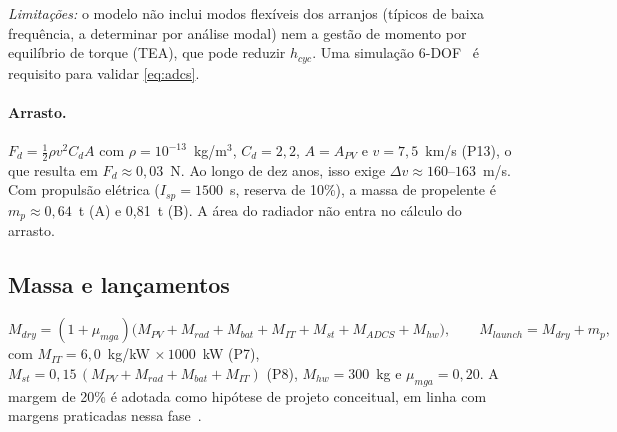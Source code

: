 \documentclass[11pt,a4paper]{article}
\begin{document}
\emph{Limitações:} o modelo não inclui modos flexíveis dos arranjos (típicos de
baixa frequência, a determinar por análise modal) nem a gestão de momento por
equilíbrio de torque (TEA), que pode reduzir $h_{cyc}$. Uma simulação
6-DOF~\cite{r27,r31} é requisito para validar \eqref{eq:adcs}.

\paragraph{Arrasto.} $F_d=\tfrac12\rho v^{2}C_dA$ com $\rho=10^{-13}$~kg/m$^3$,
$C_d=2{,}2$, $A=A_{PV}$ e $v=7{,}5$~km/s (P13), o que resulta em
$F_d\approx0{,}03$~N. Ao longo de dez anos, isso exige
$\Delta v\approx160$--$163$~m/s. Com propulsão elétrica ($I_{sp}=1500$~s,
reserva de 10\%), a massa de propelente é $m_p\approx0{,}64$~t (A) e 0,81~t (B).
A área do radiador não entra no cálculo do arrasto.

\subsection{Massa e lançamentos}
\begin{equation}
  M_{dry}=(1+\mu_{mga})\big(M_{PV}+M_{rad}+M_{bat}+M_{IT}+M_{st}+M_{ADCS}+M_{hw}\big),
  \qquad M_{launch}=M_{dry}+m_p,
  \label{eq:mass}
\end{equation}
com $M_{IT}=6{,}0$~kg/kW $\times\,1000$~kW (P7),
$M_{st}=0{,}15\,(M_{PV}+M_{rad}+M_{bat}+M_{IT})$ (P8), $M_{hw}=300$~kg e
$\mu_{mga}=0{,}20$. A margem de 20\% é adotada como hipótese de projeto
conceitual, em linha com margens praticadas nessa fase~\cite{r3}.
\end{document}
